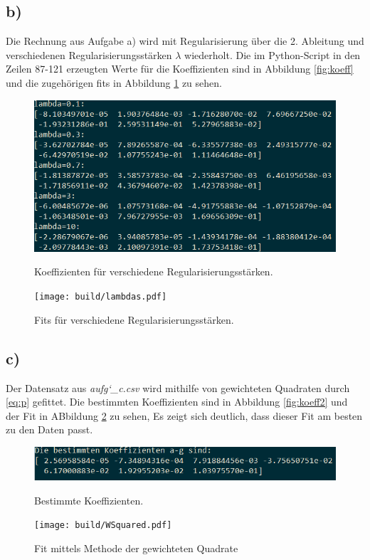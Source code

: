 \subsection*{b)}
Die Rechnung aus Aufgabe a) wird mit Regularisierung über die 2. Ableitung und verschiedenen Regularisierungsstärken $\lambda$ wiederholt.
Die im Python-Script in den Zeilen 87-121 erzeugten Werte für die Koeffizienten sind in Abbildung \ref{fig:koeff} und die zugehörigen fits in Abbildung \ref{fig:lambdas} zu sehen.
\begin{figure}
\centering
\includegraphics[width=\textwidth]{content/images/koeff.png}
\caption{Koeffizienten für verschiedene Regularisierungsstärken.}
\label{fig:koeff}
\texttt{[image: build/lambdas.pdf]}
\caption{Fits für verschiedene Regularisierungsstärken.}
\label{fig:lambdas}
\end{figure}
\subsection*{c)}
Der Datensatz aus \textit{aufg\char`_c.csv} wird mithilfe von gewichteten Quadraten durch \eqref{eq:p}
gefittet. Die bestimmten Koeffizienten sind in Abbildung \ref{fig:koeff2} und der Fit in ABbildung \ref{fig:wsq} zu sehen,
Es zeigt sich deutlich, dass dieser Fit am besten zu den Daten passt.
\begin{figure}
\includegraphics[width=\textwidth]{content/images/koeff2.png}
\caption{Bestimmte Koeffizienten.}
\label{fig:koeff2}
\texttt{[image: build/WSquared.pdf]}
\caption{Fit mittels Methode der gewichteten Quadrate}
\label{fig:wsq}
\end{figure}
